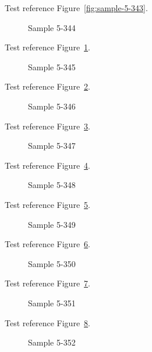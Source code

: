 Test reference Figure~\ref{fig:sample-5-343}.

\begin{figure}[tbhp]
\caption{Sample 5-344}
\label{fig:sample-5-344}
\end{figure}

Test reference Figure~\ref{fig:sample-5-344}.

\begin{figure}[tbhp]
\caption{Sample 5-345}
\label{fig:sample-5-345}
\end{figure}

Test reference Figure~\ref{fig:sample-5-345}.

\begin{figure}[tbhp]
\caption{Sample 5-346}
\label{fig:sample-5-346}
\end{figure}

Test reference Figure~\ref{fig:sample-5-346}.

\begin{figure}[tbhp]
\caption{Sample 5-347}
\label{fig:sample-5-347}
\end{figure}

Test reference Figure~\ref{fig:sample-5-347}.

\begin{figure}[tbhp]
\caption{Sample 5-348}
\label{fig:sample-5-348}
\end{figure}

Test reference Figure~\ref{fig:sample-5-348}.

\begin{figure}[tbhp]
\caption{Sample 5-349}
\label{fig:sample-5-349}
\end{figure}

Test reference Figure~\ref{fig:sample-5-349}.

\begin{figure}[tbhp]
\caption{Sample 5-350}
\label{fig:sample-5-350}
\end{figure}

Test reference Figure~\ref{fig:sample-5-350}.

\begin{figure}[tbhp]
\caption{Sample 5-351}
\label{fig:sample-5-351}
\end{figure}

Test reference Figure~\ref{fig:sample-5-351}.

\begin{figure}[tbhp]
\caption{Sample 5-352}
\label{fig:sample-5-352}
\end{figure}

